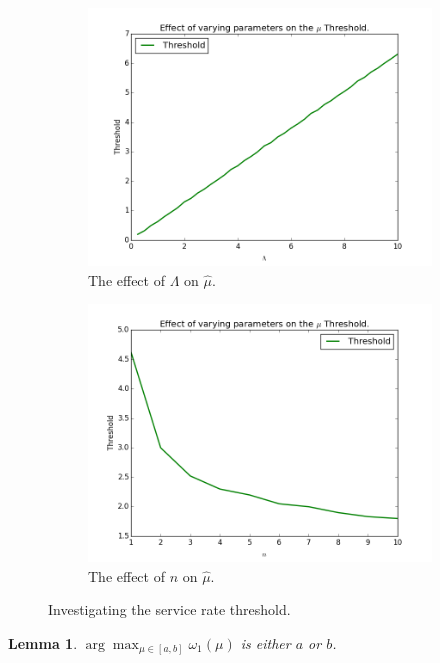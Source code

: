 \documentclass{article}
\newtheorem{lemma}{Lemma}
\begin{document}
\begin{figure}[!htbp]
\begin{subfigure}[b]{0.5\textwidth}
    \includegraphics[width=\textwidth]{images/plot_thresholds_L}
    \caption{The effect of $\Lambda$ on $\hat{\mu}$.}
    \label{fig:threshold_L}
  \end{subfigure}
  \begin{subfigure}[b]{0.5\textwidth}
    \includegraphics[width=\textwidth]{images/plot_thresholds_n}
    \caption{The effect of $n$ on $\hat{\mu}$.}
    \label{fig:threshold_n}
  \end{subfigure}
  \caption{Investigating the service rate threshold.}
  \label{fig:threshold_investigate}
\end{figure}

\begin{lemma}\label{lem:maximaoninterval}
$\arg\max_{\mu \in [a, b]} \omega_1(\mu)$ is either $a$ or $b$.
\end{lemma}
\end{document}
